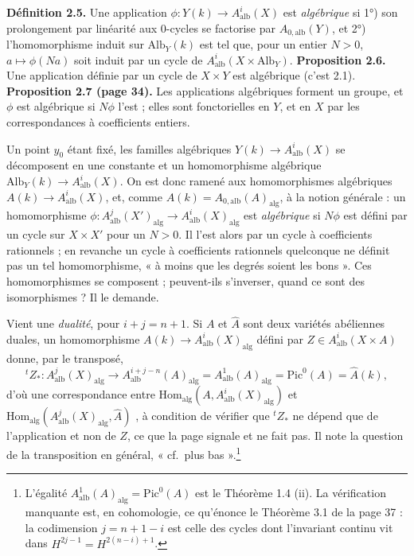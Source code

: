 \documentclass[11pt,a4paper]{article}
\begin{document}
\textbf{Définition 2.5.} Une application $\phi \colon Y(k) \to
A^{i}_{\mathrm{alb}}(X)$ est \emph{algébrique} si 1°) son prolongement par
linéarité aux $0$-cycles se factorise par $A_{0,\mathrm{alb}}(Y)$, et 2°)
l'homomorphisme induit sur $\mathrm{Alb}_{Y}(k)$ est tel que, pour un entier $N >
0$, $a \mapsto \phi(Na)$ soit induit par un cycle de $A^{i}_{\mathrm{alb}}(X
\times \mathrm{Alb}_{Y})$. \textbf{Proposition 2.6.} Une application définie
par un cycle de $X \times Y$ est algébrique (c'est 2.1).
\textbf{Proposition 2.7 (page 34).} Les applications algébriques forment un
groupe, et $\phi$ est algébrique si $N\phi$ l'est ; elles sont fonctorielles en
$Y$, et en $X$ par les correspondances à coefficients entiers.

Un point $y_{0}$ étant fixé, les familles algébriques $Y(k) \to
A^{i}_{\mathrm{alb}}(X)$ se décomposent en une constante et un homomorphisme
algébrique $\mathrm{Alb}_{Y}(k) \to A^{i}_{\mathrm{alb}}(X)$. On est donc ramené
aux homomorphismes algébriques $A(k) \to A^{i}_{\mathrm{alb}}(X)$, et, comme
$A(k) = A_{0,\mathrm{alb}}(A)_{\mathrm{alg}}$, à la notion générale :
un homomorphisme $\phi \colon A^{j}_{\mathrm{alb}}(X')_{\mathrm{alg}} \to
A^{i}_{\mathrm{alb}}(X)_{\mathrm{alg}}$ est \emph{algébrique} si $N\phi$ est
défini par un cycle sur $X \times X'$ pour un $N > 0$. Il l'est alors par un
cycle à coefficients rationnels ; en revanche un cycle à coefficients rationnels
quelconque ne définit pas un tel homomorphisme, « à moins que les degrés soient
les bons ». Ces homomorphismes se composent ; peuvent-ils s'inverser, quand ce
sont des isomorphismes ? Il le demande.

Vient une \emph{dualité}, pour $i + j = n + 1$. Si $A$ et $\hat{A}$ sont deux
variétés abéliennes duales, un homomorphisme $A(k) \to
A^{i}_{\mathrm{alb}}(X)_{\mathrm{alg}}$ défini par $Z \in
A^{i}_{\mathrm{alb}}(X \times A)$ donne, par le transposé,
\[
{}^{t}Z_{*} \colon A^{j}_{\mathrm{alb}}(X)_{\mathrm{alg}} \longrightarrow
A^{i+j-n}_{\mathrm{alb}}(A)_{\mathrm{alg}} = A^{1}_{\mathrm{alb}}(A)_{\mathrm{alg}}
= \mathrm{Pic}^{0}(A) = \hat{A}(k) ,
\]
d'où une correspondance entre $\mathrm{Hom}_{\mathrm{alg}}(A,
A^{i}_{\mathrm{alb}}(X)_{\mathrm{alg}})$ et
$\mathrm{Hom}_{\mathrm{alg}}(A^{j}_{\mathrm{alb}}(X)_{\mathrm{alg}}, \hat{A})$
, à condition de vérifier que ${}^{t}Z_{*}$ ne dépend que de l'application et
non de $Z$, ce que la page signale et ne fait pas. Il note la question de la
transposition en général, « cf.\ plus bas ».\footnote{L'égalité
$A^{1}_{\mathrm{alb}}(A)_{\mathrm{alg}} = \mathrm{Pic}^{0}(A)$ est le Théorème
1.4 (ii). La vérification manquante est, en cohomologie, ce
qu'énonce le Théorème 3.1 de la page 37 : la codimension $j = n + 1 - i$ est
celle des cycles dont l'invariant continu vit dans $H^{2j-1} = H^{2(n-i)+1}$.}
\end{document}
